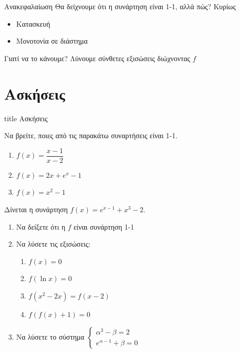 \documentclass{presentation}
\begin{document}
\begin{frame}{Ανακεφαλαίωση}
  Θα δείχνουμε ότι η συνάρτηση είναι 1-1, αλλά πώς? \pause
  Κυρίως
  \begin{itemize}
    \item Κατασκευή \pause
    \item Μονοτονία σε διάστημα
  \end{itemize} \pause
  \begin{alertblock}{Γιατί να το κάνουμε?}
    Λύνουμε σύνθετες εξισώσεις διώχνοντας $f$
  \end{alertblock}
\end{frame}


\section{Ασκήσεις}

\begin{frame}[noframenumbering]
  \vfill
  \centering
  \begin{beamercolorbox}[sep=8pt,center,shadow=true,rounded=true]{title}
    Ασκήσεις
  \end{beamercolorbox}
  \vfill
\end{frame}

\begin{askisi}
  Να βρείτε, ποιες από τις  παρακάτω συναρτήσεις είναι 1-1.
  \begin{enumerate}
    \item $f(x)=\dfrac{x-1}{x-2}$\pause
    \item $f(x)=2x+e^x-1$\pause
    \item $f(x)=x^2-1$
  \end{enumerate}
\end{askisi}

\begin{askisi}
  Δίνεται η συνάρτηση $f(x)=e^{x-1}+x^3-2$.
  \begin{enumerate}[<+-|alert@+>]
    \item Να δείξετε ότι η $f$ είναι συνάρτηση 1-1
    \item Να λύσετε τις εξισώσεις:
          \begin{enumerate}[<+-|alert@+>]
            \item $f(x)=0$
            \item $f(\ln x)=0$
            \item $f(x^2-2x)=f(x-2)$
            \item $f\left(f(x)+1\right)=0$
          \end{enumerate}
    \item Να λύσετε το σύστημα $\begin{cases}
              α^3-β=2 \\
              e^{α-1}+β=0
            \end{cases}$
  \end{enumerate}
\end{askisi}
\end{document}
